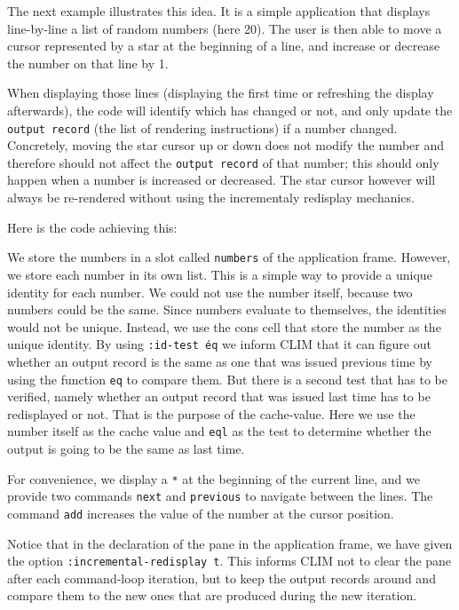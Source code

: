 The next example illustrates this idea.  It is a simple application
that displays line-by-line a list of random numbers (here 20). The
user is then able to move a cursor represented by a star at the
beginning of a line, and increase or decrease the number on that line
by 1.

When displaying those lines (displaying the first time or refreshing
the display afterwards), the code will identify which has changed or
not, and only update the \texttt{output record} (the list of rendering
instructions) if a number changed. Concretely, moving the star cursor
up or down does not modify the number and therefore should not affect
the \texttt{output record} of that number; this should only happen
when a number is increased or decreased. The star cursor however will
always be re-rendered without using the incrementaly redisplay
mechanics.


Here is the code achieving this:



We store the numbers in a slot called \texttt{numbers} of the
application frame.  However, we store each number in its own list.
This is a simple way to provide a unique identity for each number.  We
could not use the number itself, because two numbers could be the
same. Since numbers evaluate to themselves, the identities would not
be unique.  Instead, we use the cons cell that store the number as the
unique identity.  By using \texttt{:id-test \'eq} we inform CLIM that
it can figure out whether an output record is the same as one that was
issued previous time by using the function \texttt{eq} to compare
them.  But there is a second test that has to be verified, namely
whether an output record that was issued last time has to be
redisplayed or not.  That is the purpose of the cache-value.  Here we
use the number itself as the cache value and \texttt{eql} as the test
to determine whether the output is going to be the same as last time.

For convenience, we display a \texttt{*} at the beginning of the
current line, and we provide two commands \texttt{next} and
\texttt{previous} to navigate between the lines. The command
\texttt{add} increases the value of the number at the cursor position.

Notice that in the declaration of the pane in the application frame,
we have given the option \texttt{:incremental-redisplay t}.  This
informs CLIM not to clear the pane after each command-loop iteration,
but to keep the output records around and compare them to the new ones
that are produced during the new iteration.

